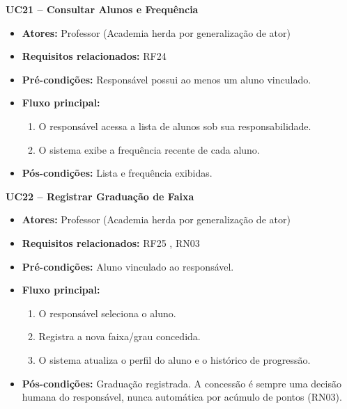 \noindent\textbf{UC21 -- Consultar Alunos e Frequência}
\begin{itemize}[leftmargin=*, itemsep=0pt, topsep=2pt]
  \item \textbf{Atores:} Professor (Academia herda por generalização de ator)
  \item \textbf{Requisitos relacionados:} RF24
  \item \textbf{Pré-condições:} Responsável possui ao menos um aluno vinculado.
  \item \textbf{Fluxo principal:}
  \begin{enumerate}[label=\arabic*., itemsep=0pt, topsep=0pt]
    \item O responsável acessa a lista de alunos sob sua responsabilidade.
    \item O sistema exibe a frequência recente de cada aluno.
  \end{enumerate}
  \item \textbf{Pós-condições:} Lista e frequência exibidas.
\end{itemize}
\medskip

\noindent\textbf{UC22 -- Registrar Graduação de Faixa}
\begin{itemize}[leftmargin=*, itemsep=0pt, topsep=2pt]
  \item \textbf{Atores:} Professor (Academia herda por generalização de ator)
  \item \textbf{Requisitos relacionados:} RF25 , RN03
  \item \textbf{Pré-condições:} Aluno vinculado ao responsável.
  \item \textbf{Fluxo principal:}
  \begin{enumerate}[label=\arabic*., itemsep=0pt, topsep=0pt]
    \item O responsável seleciona o aluno.
    \item Registra a nova faixa/grau concedida.
    \item O sistema atualiza o perfil do aluno e o histórico de progressão.
  \end{enumerate}
  \item \textbf{Pós-condições:} Graduação registrada. A concessão é sempre uma decisão humana do responsável, nunca automática por acúmulo de pontos (RN03).
\end{itemize}
\medskip

